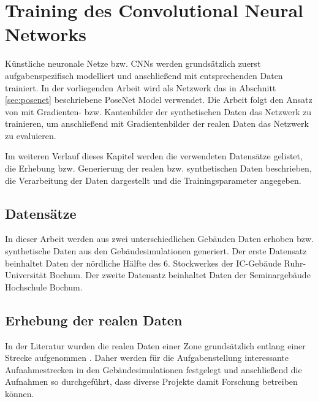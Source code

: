 \newpage
\section{Training des Convolutional Neural Networks}
Künstliche neuronale Netze bzw. CNNs werden grundsätzlich zuerst aufgabenspezifisch modelliert und anschließend mit entsprechenden Daten trainiert.  In der vorliegenden Arbeit wird als Netzwerk das in Abschnitt \ref{sec:posenet} beschriebene PoseNet Model verwendet. Die Arbeit folgt den Ansatz von \citet{acharyaBIMPoseNetIndoorCamera2019} mit Gradienten- bzw. Kantenbilder der synthetischen Daten das Netzwerk zu trainieren, um anschließend mit Gradientenbilder der realen Daten das Netzwerk zu evaluieren. 

Im weiteren Verlauf dieses Kapitel werden die verwendeten Datensätze gelistet, die Erhebung bzw. Generierung der realen bzw. synthetischen Daten beschrieben, die Verarbeitung der Daten dargestellt und die Trainingsparameter angegeben. 


\subsection{Datensätze}

In dieser Arbeit werden aus zwei unterschiedlichen Gebäuden Daten erhoben bzw. synthetische Daten aus den Gebäudesimulationen generiert. 
Der erste Datensatz beinhaltet Daten der nördliche Hälfte des 6. Stockwerkes der IC-Gebäude Ruhr-Universität Bochum. Der zweite Datensatz beinhaltet Daten der Seminargebäude Hochschule Bochum.

\newpage
\subsection{Erhebung der realen Daten}
\label{subsec:record_real_data}
In der Literatur wurden die realen Daten einer Zone grundsätzlich entlang einer Strecke aufgenommen \cite{kendallPoseNetConvolutionalNetwork2015, clarkVidLocDeepSpatioTemporal2017, acharyaBIMPoseNetIndoorCamera2019}. Daher werden für die Aufgabenstellung interessante Aufnahmestrecken in den Gebäudesimulationen festgelegt und anschließend die Aufnahmen so durchgeführt, dass diverse Projekte damit Forschung betreiben können. 

